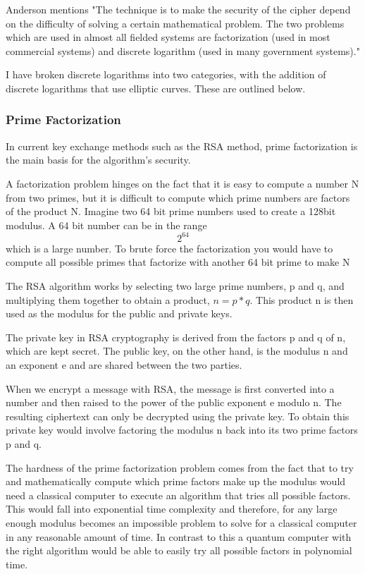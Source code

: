 \documentclass{article}
\begin{document}
Anderson mentions \cite{AndersonR2020} "The technique is to make the security of the cipher depend on the difficulty of solving a certain mathematical problem. The two problems which are used in almost all fielded systems are factorization (used in most commercial systems) and discrete logarithm (used in many government systems)." 

I have broken discrete logarithms into two categories, with the addition of discrete logarithms that use elliptic curves. These are outlined below.

\subsubsection{Prime Factorization}

In current key exchange methods such as the RSA method, prime factorization is the main basis for the algorithm's security. 

A factorization problem hinges on the fact that it is easy to compute a number N from two primes, but it is difficult to compute which prime numbers are factors of the product N. Imagine two 64 bit prime numbers used to create a 128bit modulus. A 64 bit number can be in the range \[2^{64}\] which is a large number. To brute force the factorization you would have to compute all possible primes that factorize with another 64 bit prime to make N

The RSA algorithm works by selecting two large prime numbers, p and q, and multiplying them together to obtain a product, $n = p*q$. This product n is then used as the modulus for the public and private keys.

The private key in RSA cryptography is derived from the factors p and q of n, which are kept secret. The public key, on the other hand, is the modulus n and an exponent e and are shared between the two parties.

When we encrypt a message with RSA, the message is first converted into a number and then raised to the power of the public exponent e modulo n. The resulting ciphertext can only be decrypted using the private key. To obtain this private key would  involve factoring the modulus n back into its two prime factors p and q.

The hardness of the prime factorization problem comes from the fact that to try and mathematically compute which prime factors make up the modulus would need a classical computer to execute an algorithm that tries all possible factors. This would fall into exponential time complexity and therefore, for any large enough modulus becomes an impossible problem to solve for a classical computer in any reasonable amount of time.  In contrast to this a quantum computer with the right algorithm would be able to easily try all possible factors in polynomial time.
\end{document}
